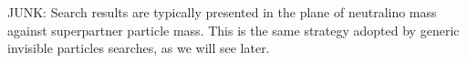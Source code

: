 


%

JUNK: Search results are typically presented in the plane of neutralino mass against superpartner particle mass.
This is the same strategy adopted by generic invisible particles searches, as we will see later. 
